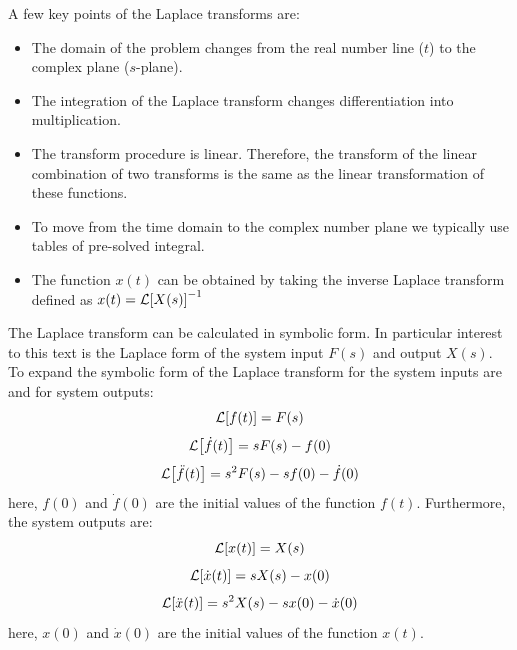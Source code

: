 \documentclass[12pt,letter]{article}
\begin{document}
\begin{review}
	A few key points of the Laplace transforms are:
	
	\begin{itemize}
		\item The domain of the problem changes from the real number line ($t$) to the complex plane ($s$-plane).
		\item The integration of the Laplace transform changes differentiation into multiplication.
		\item The transform procedure is linear. Therefore, the transform of the linear combination of two transforms is the same as the linear transformation of these functions. 
		\item To move from the time domain to the complex number plane we typically use tables of pre-solved integral. 
		\item The function $x(t)$ can be obtained by taking the inverse Laplace transform defined as $x(t) = \mathcal{L}{\left[X(s)\right]}^{-1}$
	\end{itemize}
	
	The Laplace transform can be calculated in symbolic form. In particular interest to this text is the Laplace form of the system input $F(s)$ and output $X(s)$. To expand the symbolic form of the Laplace transform for the system inputs are 
	and for system outputs:
	\begin{equation}
		\label{eq:laplace_f}
		\mathcal{L}{\left[f(t)\right]} = F(s)
	\end{equation}		
	\begin{equation}
		\label{eq:laplace_f'}
		\mathcal{L}{\left[\dot{f}(t)\right]} = sF(s)-f(0)
	\end{equation}	
	\begin{equation}
		\label{eq:laplace_f''}
		\mathcal{L}{\left[\ddot{f}(t)\right]} = s^2F(s)-sf(0) - \dot{f}(0)
	\end{equation}	
	here, $f(0)$ and $\dot{f}(0)$ are the initial values of the function $f(t)$.  Furthermore, the system outputs are:
	\begin{equation}
		\label{eq:laplace_x}
		\mathcal{L}{\left[x(t)\right]} = X(s)
	\end{equation}		
	\begin{equation}
		\label{eq:laplace_x'}
		\mathcal{L}{\left[\dot{x}(t)\right]} = sX(s)-x(0)
	\end{equation}	
	\begin{equation}
		\label{eq:laplace_x''}
		\mathcal{L}{\left[\ddot{x}(t)\right]} = s^2X(s)-sx(0) - \dot{x}(0)
	\end{equation}	
	here, $x(0)$ and $\dot{x}(0)$ are the initial values of the function $x(t)$. 		
	
\end{review}
\end{document}
